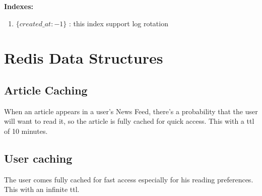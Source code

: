 \textbf{Indexes:}

\begin{enumerate}
  \item $\{ created\_at: -1 \}$ : this index support log rotation
\end{enumerate}

\section{Redis Data Structures}\label{sec:redis-data-structures}

\subsection{Article Caching}\label{subsec:article-caching}

When an article appears in a user's News Feed, there's a probability that the user will want to read it, so the article is fully cached for quick access.
This with a ttl of 10 minutes.

\subsection{User caching}\label{subsec:user-caching}

The user comes fully cached for fast access especially for his reading preferences.
This with an infinite ttl.






